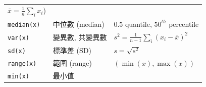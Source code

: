 \documentclass[
]{book}
\begin{document}
\begin{longtable}[]{@{}lll@{}}
\begin{minipage}[t]{0.51\columnwidth}
\(\bar{x} = \frac{1}{n} \sum_i x_i\))\strut
\end{minipage}\tabularnewline
\begin{minipage}[t]{0.19\columnwidth}\raggedright
\texttt{median(x)}\strut
\end{minipage} & \begin{minipage}[t]{0.21\columnwidth}\raggedright
中位數 (median)\strut
\end{minipage} & \begin{minipage}[t]{0.51\columnwidth}\raggedright
\(0.5\) quantile, \(50^{th}\) percentile\strut
\end{minipage}\tabularnewline
\begin{minipage}[t]{0.19\columnwidth}\raggedright
\texttt{var(x)}\strut
\end{minipage} & \begin{minipage}[t]{0.21\columnwidth}\raggedright
變異數, 共變異數\strut
\end{minipage} & \begin{minipage}[t]{0.51\columnwidth}\raggedright
\(s^2 = \frac{1}{n-1} \sum_i (x_i - \bar{x})^2\)\strut
\end{minipage}\tabularnewline
\begin{minipage}[t]{0.19\columnwidth}\raggedright
\texttt{sd(x)}\strut
\end{minipage} & \begin{minipage}[t]{0.21\columnwidth}\raggedright
標準差 (SD)\strut
\end{minipage} & \begin{minipage}[t]{0.51\columnwidth}\raggedright
\(s = \sqrt{s^2}\)\strut
\end{minipage}\tabularnewline
\begin{minipage}[t]{0.19\columnwidth}\raggedright
\texttt{range(x)}\strut
\end{minipage} & \begin{minipage}[t]{0.21\columnwidth}\raggedright
範圍 (range)\strut
\end{minipage} & \begin{minipage}[t]{0.51\columnwidth}\raggedright
\((\min (x), \max (x))\)\strut
\end{minipage}\tabularnewline
\begin{minipage}[t]{0.19\columnwidth}\raggedright
\texttt{min(x)}\strut
\end{minipage} & \begin{minipage}[t]{0.21\columnwidth}\raggedright
最小值\strut
\end{minipage} & \begin{minipage}[t]{0.51\columnwidth}\raggedright

\end{minipage}
\end{longtable}
\end{document}
